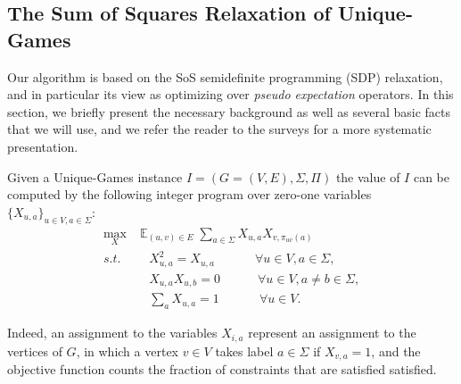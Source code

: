 \documentclass[11pt]{article}
\DeclareMathOperator*{\E}{\mathbb{E}}
\def \sos {SoS\xspace}
\theoremstyle{definition}
\begin{document}


\subsection{The Sum of Squares Relaxation of Unique-Games}
Our algorithm is based on the \sos semidefinite programming (SDP) relaxation, and in particular its view as optimizing over \emph{pseudo expectation} operators. In this section, we 
briefly present the necessary background as well as several 
basic facts that we will use, and we refer the reader to the
surveys \cite{BarakS14,RaghavendraSS18,TCS-086} for a more 
systematic presentation.

Given a Unique-Games instance $I= (G=(V,E),\Sigma,\Pi)$
the value of $I$ can be computed by the following integer program over zero-one variables $\{ X_{u,a} \}_{u \in V, a \in \Sigma}$:
\begin{align}
\max_{X}& \E_{(u,v) \in E} \sum_{a \in \Sigma} X_{u,a} X_{v,\pi_{uv}(a)} \label{eq:ip}\\
s.t. 
&\quad X_{u,a}^2 = X_{u,a} ~\qquad\quad \forall u \in V, a \in \Sigma \nonumber,\\
&\quad X_{u,a}X_{u,b} = 0 \qquad\quad \forall u \in V, a \neq b \in \Sigma \nonumber,\\
&\quad \sum_{a} X_{u,a} = 1 ~\qquad\quad \forall u \in V\nonumber.
\end{align}

Indeed, an assignment to the variables $X_{i,a}$ represent 
an assignment to the vertices of $G$, in which a vertex $v \in V$ takes label $a \in \Sigma$ if $X_{v,a} = 1$, and the objective function counts the fraction of constraints 
that are satisfied satisfied.
\end{document}
